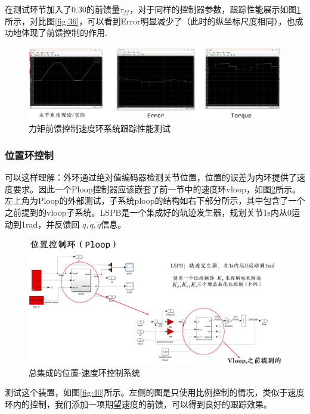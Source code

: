 在测试环节加入了0.30的前馈量$\tau_{ff}$，对于同样的控制器参数，跟踪性能展示如图\ref{fig:38}所示，对比图\ref{fig:36}，可以看到Error明显减少了（此时的纵坐标尺度相同），也成功地体现了前馈控制的作用.

\begin{figure}[htbp]
    \centering
    \includegraphics[width=\textwidth]{Image/fig42.png}
    \caption{力矩前馈控制速度环系统跟踪性能测试}
    \label{fig:38}
\end{figure}

\subsubsection{位置环控制}
可以这样理解：外环通过绝对值编码器检测关节位置，位置的误差为内环提供了速度要求。因此一个Ploop控制器应该嵌套了前一节中的速度环vloop，如图\ref{fig:39}所示。左上角为Ploop的外部测试，子系统ploop的结构如右下部分所示，其中包含了一个之前提到的vloop子系统。LSPB是一个集成好的轨迹发生器，规划关节1s内从0运动到1rad，并反馈回 $q,\dot{q},\ddot{q}$信息。

\begin{figure}[htbp]
    \centering
    \includegraphics[width=\textwidth]{Image/ploop.png}
    \caption{总集成的位置-速度环控制系统}
    \label{fig:39}
\end{figure}

测试这个装置，如图\ref{fig:40}所示。左侧的图是只使用比例控制的情况，类似于速度环内的控制，我们添加一项期望速度的前馈，可以得到良好的跟踪效果。

